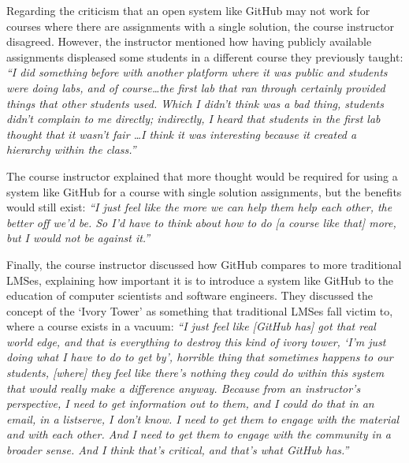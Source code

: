
Regarding the criticism that an open system like GitHub may not work for courses where there are assignments with a single solution, the course instructor disagreed. However, the instructor mentioned how having publicly available assignments displeased some students in a different course they previously taught: \textit{``I did something before with another platform where it was public and students were doing labs, and of course\ldots the first lab that ran through certainly provided things that other students used. Which I didn't think was a bad thing, students didn't complain to me directly; indirectly, I heard that students in the first lab thought that it wasn't fair \ldots I think it was interesting because it created a hierarchy within the class.''}

The course instructor explained that more thought would be required for using a system like GitHub for a course with single solution assignments, but the benefits would still exist: \textit{``I just feel like the more we can help them help each other, the better off we'd be. So I'd have to think about how to do [a course like that] more, but I would not be against it.''}

Finally, the course instructor discussed how GitHub compares to more traditional LMSes, explaining how important it is to introduce a system like GitHub to the education of computer scientists and software engineers. They discussed the concept of the `Ivory Tower' as something that traditional LMSes fall victim to, where a course exists in a vacuum: \textit{``I just feel like [GitHub has] got that real world edge, and that is everything to destroy this kind of ivory tower, `I'm just doing what I have to do to get by', horrible thing that sometimes happens to our students, [where] they feel like there's nothing they could do within this system that would really make a difference anyway. Because from an instructor's perspective, I need to get information out to them, and I could do that in an email, in a listserve, I don't know. I need to get them to engage with the material and with each other. And I need to get them to engage with the community in a broader sense. And I think that's critical, and that's what GitHub has.''}

